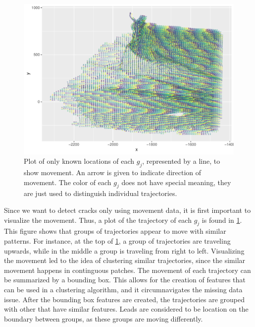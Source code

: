 \documentclass[12pt]{article}
\begin{document}
\begin{figure}[tbp]

{\centering \includegraphics[width=\linewidth,]{spatio-temporal-model-arctic-sea-ice_files/figure-latex/trajectories-1} 

}

\caption{Plot of only known locations of each $g_j$, represented by a line, to show movement. An arrow is given to indicate direction of movement. The color of each $g_j$ does not have special meaning, they are just used to distinguish individual trajectories.}\label{fig:trajectories}
\end{figure}

Since we want to detect cracks only using movement data, it is first
important to visualize the movement. Thus, a plot of the trajectory of
each \(g_j\) is found in \cref{fig:trajectories}. This figure shows that
groups of trajectories appear to move with similar patterns. For
instance, at the top of \cref{fig:trajectories}, a group of trajectories
are traveling upwards, while in the middle a group is traveling from
right to left. Visualizing the movement led to the idea of clustering
similar trajectories, since the similar movement happens in continguous
patches. The movement of each trajectory can be summarized by a bounding
box. This allows for the creation of features that can be used in a
clustering algorithm, and it circumnavigates the missing data issue.
After the bounding box features are created, the trajectories are
grouped with other that have similar features. Leads are considered to
be location on the boundary between groups, as these groups are moving
differently.
\end{document}
